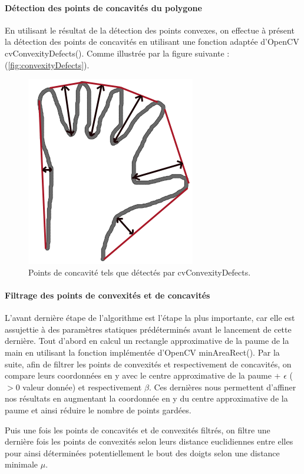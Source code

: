 \paragraph{Détection des points de concavités du polygone}
En utilisant le résultat de la détection des points convexes, on effectue à présent la détection des points de concavités en utilisant une fonction adaptée d’OpenCV cvConvexityDefects(). Comme illustrée par la figure suivante : (\autoref{fig:convexityDefects}).

\begin{figure}[htb!]
\centerline{\includegraphics[scale=0.6]{convexityDefects.png}}
\caption{Points de concavité tels que détectés par cvConvexityDefects.}
\label{fig:convexityDefects}
\end{figure}

\paragraph{Filtrage des points de convexités et de concavités}
L’avant dernière étape de l’algorithme est l’étape la plus importante, car elle est assujettie à des paramètres statiques prédéterminés avant le lancement de cette dernière. 
Tout d’abord en calcul un rectangle approximative de la paume de la main en utilisant la fonction implémentée d’OpenCV minAreaRect().
Par la suite, afin de filtrer les points de convexités et respectivement de concavités, on compare leurs coordonnées en y avec le centre approximative de la paume + $\epsilon$ ($>0$ valeur donnée) et respectivement $\beta$. Ces dernières nous permettent d’affiner nos résultats en augmentant la coordonnée en y du centre approximative de la paume et ainsi réduire le nombre de points gardées.

Puis une fois les points de concavités et de convexités filtrés, on filtre une dernière fois les points de convexités selon leurs distance euclidiennes entre elles pour ainsi déterminées potentiellement le bout des doigts selon une distance minimale $\mu$.

